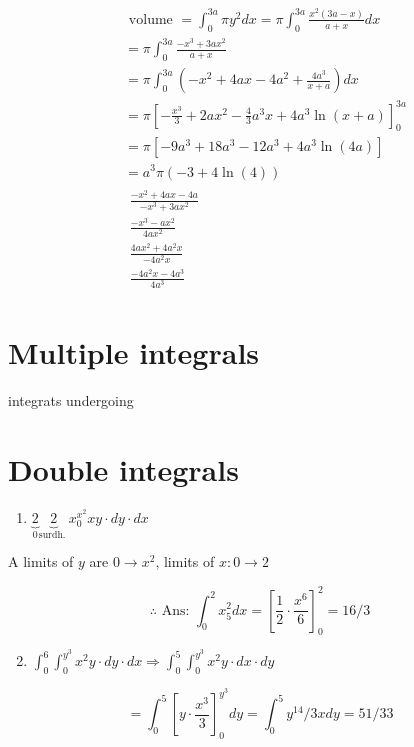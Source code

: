 \documentclass[12pt, a4paper]{article}
\begin{document}
$$
\begin{aligned}
& \text { volume }=\int_{0}^{3 a} \pi y^{2} d x=\pi \int_{0}^{3 a} \frac{x^{2}(3 a-x)}{a+x} d x \\
& =\pi \int_{0}^{3 a} \frac{-x^{3}+3 a x^{2}}{a+x} \\
& =\pi \int_{0}^{3 a}\left(-x^{2}+4 a x-4 a^{2}+\frac{4 a^{3}}{x+a}\right) d x \\
& =\pi\left[-\frac{x^{3}}{3}+2 a x^{2}-\frac{4}{3} a^{3} x+4 a^{3} \ln (x+a)\right]_{0}^{3 a} \\
& =\pi\left[-9 a^{3}+18 a^{3}-12 a^{3}+4 a^{3} \ln (4 a)\right] \\
& =a^{3} \pi(-3+4 \ln (4)) \\
& \begin{array}{c}
\frac{-x^{2}+4 a x-4 a}{-x^{3}+3 a x^{2}} \\
\frac{-x^{3}-a x^{2}}{4 a x^{2}} \\
\frac{4 a x^{2}+4 a^{2} x}{-4 a^{2} x} \\
\frac{-4 a^{2} x-4 a^{3}}{4 a^{3}}
\end{array}
\end{aligned}
$$

\section*{Multiple integrals}
integrats undergoing

\section*{Double integrals}
\begin{enumerate}
  \item $\underbrace{2}_{0} \underbrace{2}_{\text {surdh. }} x_{0}^{x^{2}} x y \cdot d y \cdot d x$
\end{enumerate}

A limits of $y$ are $0 \rightarrow x^{2}$, limits of $x: 0 \rightarrow 2$

$$
\therefore \text { Ans: } \int_{0}^{2} x_{5}^{2} d x=\left[\frac{1}{2} \cdot \frac{x^{6}}{6}\right]_{0}^{2}=16 / 3
$$

\begin{enumerate}
  \setcounter{enumi}{1}
  \item $\int_{0}^{6} \int_{0}^{y^{3}} x^{2} y \cdot d y \cdot d x \Rightarrow \int_{0}^{5} \int_{0}^{y^{3}} x^{2} y \cdot d x \cdot d y$
\end{enumerate}

$$
=\int_{0}^{5}\left[y \cdot \frac{x^{3}}{3}\right]_{0}^{y^{3}} d y=\int_{0}^{5} y^{14} / 3 x d y=51 / 33
$$
\end{document}
